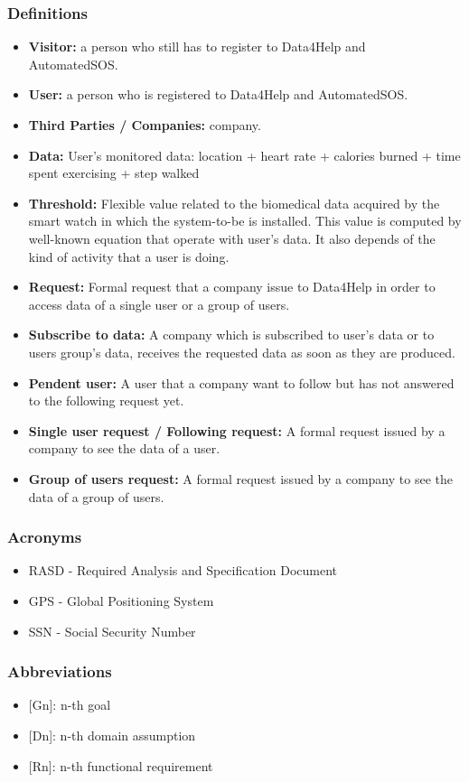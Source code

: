 \documentclass{article}
\begin{document}
\subsubsection{Definitions}
\begin{itemize}
	\item\textbf{Visitor:} a person who still has to register to Data4Help and\\ AutomatedSOS.
	\item\textbf{User:} a person who is registered to Data4Help and AutomatedSOS.
	\item\textbf{Third Parties / Companies:} company.
	\item\textbf{Data:} User's monitored data: location + heart rate + calories burned + time spent exercising + step walked 
	\item \textbf{Threshold:} Flexible value related to the biomedical data acquired by the smart watch in which the system-to-be is installed. This value is computed by well-known equation that operate with user's data. It also depends of the kind of activity that a user is doing.  
	\item \textbf{Request:} Formal request that a company issue to Data4Help in order to access data of a single user or a group of users. 
	\item \textbf{Subscribe to data:} A company which is subscribed to user's data or to users group's data, receives the requested data as soon as they are produced.  
	\item \textbf{Pendent user:} A user that a company want to follow but has not answered to the following request yet.
	\item \textbf{Single user request / Following request:} A formal request issued by a company to see the data of a user.
	\item \textbf{Group of users request:} A formal request issued by a company to see the data of a group of users.
\end{itemize}
\subsubsection{Acronyms}
\begin{itemize}
	\item RASD - Required Analysis and Specification Document
	\item GPS - Global Positioning System
	\item SSN - Social Security Number
\end{itemize}
\subsubsection{Abbreviations}
\begin{itemize}
	\item {[Gn]}: n-th goal
	\item {[Dn]}: n-th domain assumption
	\item {[Rn]}: n-th functional requirement
\end{itemize}
\end{document}
